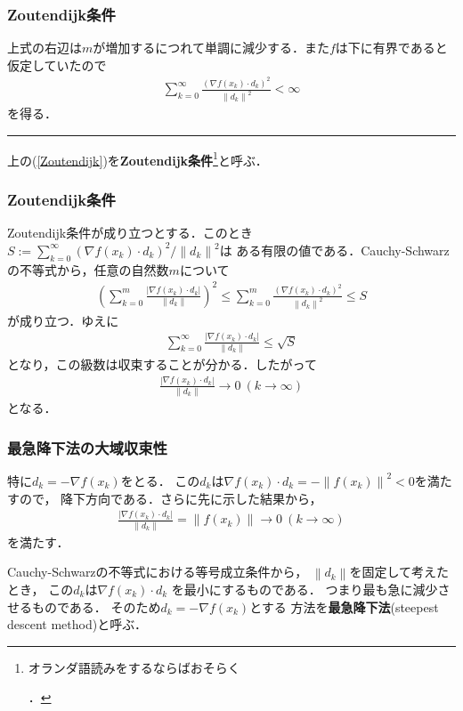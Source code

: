 \documentclass[10pt,hyperref={unicode}]{beamer}
\newcommand{\braref}[1]{{\fontfamily{cmr}\selectfont (\ref{#1})}}
\newcommand{\parentheses}[1]{\left(#1\right)}
\newcommand{\norm}[1]{\left\|#1\right\|}
\newcommand{\absolute}[1]{\left|#1\right|}
\begin{document}
\begin{frame}
\frametitle{Zoutendijk条件}
上式の右辺は$m$が増加するにつれて単調に減少する．また$f$は下に有界であると仮定していたので
\begin{align}
    \sum_{k = 0}^\infty \frac{\parentheses{\nabla f \parentheses{x_k} \cdot d_k}^2}{\left\|d_k\right\|^2} < \infty \tag{Zoutendijk} \label{Zoutendijk}
\end{align}
を得る．\hfill \rule{5pt}{10pt}

\bigskip

上の\braref{Zoutendijk}を\textbf{Zoutendijk条件}\footnote[frame]{オランダ語読みをするならばおそらく\begin{ipafont}\end{ipafont}．}と呼ぶ．
\end{frame}


\begin{frame}
\frametitle{Zoutendijk条件}
Zoutendijk条件が成り立つとする．このとき
$S := \sum_{k = 0}^\infty \parentheses{\nabla f \parentheses{x_k} \cdot d_k}^2/\norm{d_k}^2$は
ある有限の値である．Cauchy-Schwarzの不等式から，任意の自然数$m$について
\begin{align*}
    \parentheses{\sum_{k = 0}^m \frac{\absolute{\nabla f \parentheses{x_k} \cdot d_k}}{\left\|d_k\right\|}}^2 \leq
    \sum_{k = 0}^m \frac{\parentheses{\nabla f \parentheses{x_k} \cdot d_k}^2}{\left\|d_k\right\|^2} \leq S
\end{align*}
が成り立つ．ゆえに
\begin{align*}
    \sum_{k = 0}^\infty \frac{\absolute{\nabla f \parentheses{x_k} \cdot d_k}}{\left\|d_k\right\|} \leq \sqrt{S}
\end{align*}
となり，この級数は収束することが分かる．したがって
\begin{align*}
    \frac{\absolute{\nabla f \parentheses{x_k} \cdot d_k}}{\left\|d_k\right\|} \to 0 \ \parentheses{k \to \infty}
\end{align*}
となる．
\end{frame}

\begin{frame}
\frametitle{最急降下法の大域収束性}
特に$d_k = - \nabla f\parentheses{x_k}$をとる．
この$d_k$は$\nabla f\parentheses{x_k} \cdot d_k = - \norm{f\parentheses{x_k}}^2 < 0$を満たすので，
降下方向である．さらに先に示した結果から，
\begin{align*}
    \frac{\absolute{\nabla f \parentheses{x_k} \cdot d_k}}{\norm{d_k}} = \norm{f\parentheses{x_k}}  \to 0 \ \parentheses{k \to \infty}
\end{align*}
を満たす．

\bigskip

Cauchy-Schwarzの不等式における等号成立条件から，
$\norm{d_k}$を固定して考えたとき，
この$d_k$は$\nabla f\parentheses{x_k} \cdot d_k$
を最小にするものである．
つまり最も急に減少させるものである．
そのため$d_k = - \nabla f\parentheses{x_k}$とする
方法を\textbf{最急降下法}(steepest descent method)と呼ぶ．
\end{frame}
\end{document}
